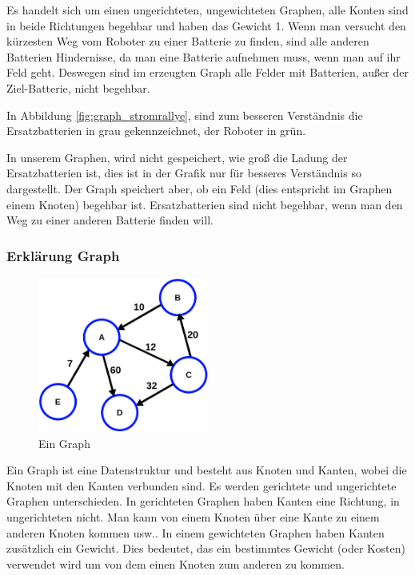 \documentclass[a4paper,12pt,arial]{scrartcl}
\begin{document}
Es handelt sich um einen ungerichteten, ungewichteten Graphen, alle Konten sind in beide Richtungen begehbar und haben das Gewicht 1.
Wenn man versucht den kürzesten Weg vom Roboter zu einer Batterie zu finden, sind alle anderen Batterien Hindernisse, da man eine Batterie aufnehmen muss, wenn man auf ihr Feld geht. Deswegen sind im erzeugten Graph alle Felder mit Batterien, außer der Ziel-Batterie, nicht begehbar.

In Abbildung \ref{fig:graph_stromrallye}, sind zum besseren Verständnis die Ersatzbatterien in grau gekennzeichnet, der Roboter in grün.

In unserem Graphen, wird nicht gespeichert, wie groß die Ladung der Ersatzbatterien ist, dies ist in der Grafik nur für besseres Verständnis so dargestellt.
Der Graph speichert aber, ob ein Feld (dies entspricht im Graphen einem Knoten) begehbar ist. Ersatzbatterien sind nicht begehbar, wenn man den Weg zu einer anderen Batterie finden will.

\newpage
\subsubsection{Erklärung Graph}
\begin{figure}
    \includegraphics[width=0.5\textwidth]{graph.pdf}
    \caption{Ein Graph \textcite{wikipediaGraph}}
    \label{fig:graph}
\end{figure}
Ein Graph ist eine Datenstruktur und besteht aus Knoten und Kanten, wobei die Knoten  mit den Kanten verbunden sind.
Es werden gerichtete und ungerichtete Graphen unterschieden.
In gerichteten Graphen haben Kanten eine Richtung, in ungerichteten nicht.
Man kann von einem Knoten über eine Kante zu einem anderen Knoten kommen usw..
In einem gewichteten Graphen haben Kanten zusätzlich ein Gewicht. Dies bedeutet, das ein bestimmtes Gewicht (oder Kosten) verwendet wird um von dem einen Knoten zum anderen zu kommen.
\end{document}
